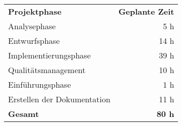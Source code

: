 \begin{tabular}{lr}
\rowcolor{heading}\textbf{Projektphase} & \textbf{Geplante Zeit} \\
Analysephase & 5 h \\
\rowcolor{odd}Entwurfsphase & 14 h \\
Implementierungsphase & 39 h \\
\rowcolor{odd}Qualitätsmanagement & 10 h \\
Einführungsphase & 1 h \\
\rowcolor{odd}Erstellen der Dokumentation & 11 h \\
\hline
\hline
\rowcolor{odd}\textbf{Gesamt} & \textbf{80 h} \\
\end{tabular}
